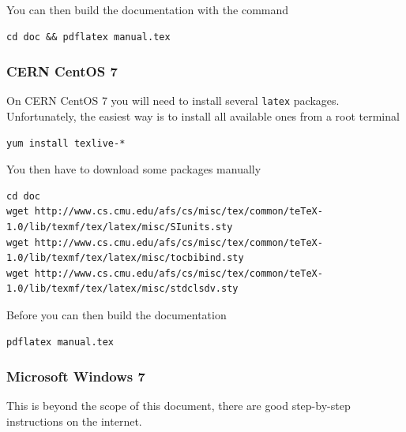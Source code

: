 \documentclass[a4paper]{article}
\begin{document}
You can then build the documentation with the command

\medskip
\begin{lstlisting}
cd doc && pdflatex manual.tex
\end{lstlisting}
\medskip

\subsubsection{CERN CentOS 7}

On CERN CentOS 7 you will need to install several {\tt latex} packages.
Unfortunately, the easiest way is to install all available ones from a root terminal

\medskip
\begin{lstlisting}
yum install texlive-*
\end{lstlisting}
\medskip

You then have to download some packages manually

\medskip
\begin{lstlisting}
cd doc
wget http://www.cs.cmu.edu/afs/cs/misc/tex/common/teTeX-1.0/lib/texmf/tex/latex/misc/SIunits.sty
wget http://www.cs.cmu.edu/afs/cs/misc/tex/common/teTeX-1.0/lib/texmf/tex/latex/misc/tocbibind.sty
wget http://www.cs.cmu.edu/afs/cs/misc/tex/common/teTeX-1.0/lib/texmf/tex/latex/misc/stdclsdv.sty
\end{lstlisting}
\medskip

Before you can then build the documentation

\medskip
\begin{lstlisting}
pdflatex manual.tex
\end{lstlisting}
\medskip

\subsubsection{Microsoft Windows 7}

This is beyond the scope of this document, there are good step-by-step instructions on the internet.
\end{document}
